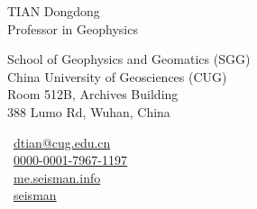 \documentclass[11pt,a4paper]{article}
\makeatletter
\newcommand{\Name}{TIAN Dongdong}
\newcommand{\CNName}{田冬冬}
\newcommand{\Role}{Professor in Geophysics}
\newcommand{\Email}{dtian@cug.edu.cn}
\newcommand{\Website}{me.seisman.info}
\newcommand{\Github}{seisman}
\newcommand{\Orcid}{0000-0001-7967-1197}
\newcommand{\Affiliation}{School of Geophysics and Geomatics (SGG) \\ China University of Geosciences (CUG)}
\newcommand{\Address}{Room 512B, Archives Building \\ 388 Lumo Rd, Wuhan, China}
\makeatother
\begin{document}
\thispagestyle{empty} %
{
\begin{center}
{\fontsize{24pt}{0}\selectfont \Name \hspace{1ex} \kaishu{\CNName}} \\[0.4cm]
{\fontsize{16pt}{0}\selectfont \Role} \\[0.2cm]
\end{center}
\begin{minipage}[t]{0.7\textwidth}
  \fontsize{12pt}{15pt}\selectfont
  \Affiliation
  \\
  \Address
\end{minipage}
\begin{minipage}[t]{0.3\textwidth}
  \fontsize{12pt}{15pt}\selectfont
  \begin{flushleft}
    \faEnvelope\ \href{mailto:\Email}{\Email}
    \\
    \faLink\ \href{https://orcid.org/\Orcid}{\Orcid}
    \\
    \faGlobe\ \href{https://\Website}{\Website}
    \\
    \faGithub\ \href{https://github.com/\Github}{\Github}
  \end{flushleft}
\end{minipage}
}
\vspace{0.2cm}








%





\end{document}

